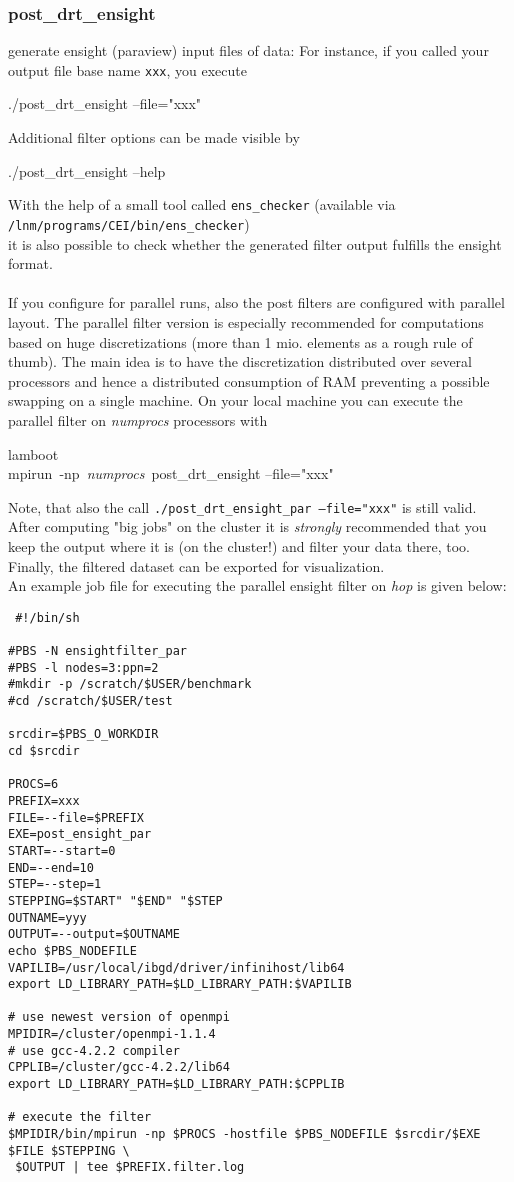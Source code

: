 \subsubsection{post\_drt\_ensight}
generate ensight (paraview) input files of \baci{} data: For
instance, if you
called your output file base name \texttt{xxx}, you execute
\begin{lyxcode}
./post\_drt\_ensight --file="xxx"
\end{lyxcode}
Additional filter options can be made visible by
\begin{lyxcode}
./post\_drt\_ensight --help
\end{lyxcode}
With the help of a small tool called \texttt{ens\_checker} (available via
 \texttt{/lnm/programs/CEI/bin/ens\_checker})\\
it is also possible to check whether the generated filter output fulfills the ensight format.\\
\\
If you configure \baci{} for parallel runs, also the post filters
are configured with parallel layout.
The parallel filter version is especially recommended for computations based on huge discretizations
(more than 1 mio. elements as a rough rule of thumb). The main idea is to have the discretization distributed over several processors and hence a distributed consumption of RAM preventing a possible swapping on a single machine.
On your local machine you can execute the parallel filter on \emph{numprocs} processors with
\begin{lyxcode}
lamboot\\
mpirun~-np~\emph{numprocs}~post\_drt\_ensight --file="xxx"
\end{lyxcode}
Note, that also the call
\texttt{./post\_drt\_ensight\_par --file="xxx"}
is still valid.\\
After computing "big jobs" on the cluster it is \emph{strongly} recommended that you keep the \baci{} output where it is (on the cluster!)
and filter your data there, too. Finally, the filtered dataset can be exported for visualization.\\
An example job file for executing the parallel ensight filter on \emph{hop} is given below:
\begin{verbatim}
 #!/bin/sh

#PBS -N ensightfilter_par
#PBS -l nodes=3:ppn=2
#mkdir -p /scratch/$USER/benchmark
#cd /scratch/$USER/test

srcdir=$PBS_O_WORKDIR
cd $srcdir

PROCS=6
PREFIX=xxx
FILE=--file=$PREFIX
EXE=post_ensight_par
START=--start=0
END=--end=10
STEP=--step=1
STEPPING=$START" "$END" "$STEP
OUTNAME=yyy
OUTPUT=--output=$OUTNAME
echo $PBS_NODEFILE
VAPILIB=/usr/local/ibgd/driver/infinihost/lib64
export LD_LIBRARY_PATH=$LD_LIBRARY_PATH:$VAPILIB

# use newest version of openmpi
MPIDIR=/cluster/openmpi-1.1.4
# use gcc-4.2.2 compiler
CPPLIB=/cluster/gcc-4.2.2/lib64
export LD_LIBRARY_PATH=$LD_LIBRARY_PATH:$CPPLIB

# execute the filter
$MPIDIR/bin/mpirun -np $PROCS -hostfile $PBS_NODEFILE $srcdir/$EXE $FILE $STEPPING \
 $OUTPUT | tee $PREFIX.filter.log
\end{verbatim}


